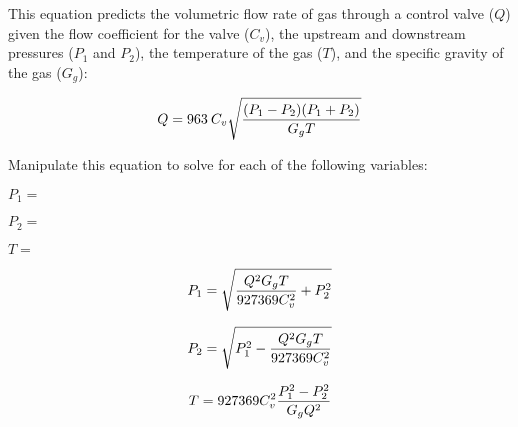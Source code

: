 

This equation predicts the volumetric flow rate of gas through a control valve ($Q$) given the flow coefficient for the valve ($C_v$), the upstream and downstream pressures ($P_1$ and $P_2$), the temperature of the gas ($T$), and the specific gravity of the gas ($G_g$):

$$Q = 963 \> C_v \sqrt{{(P_1 - P_2) (P_1 + P_2)} \over {G_g T}}$$

Manipulate this equation to solve for each of the following variables:

\vskip 10pt

$P_1 =$

\vskip 10pt

$P_2 =$

\vskip 10pt

$T =$

\vskip 10pt







$$P_1 = \sqrt{ {Q^2 G_g T \over 927369 C_v^2} + P_2^2}$$

\vskip 20pt

$$P_2 = \sqrt{P_1^2 - {Q^2 G_g T \over 927369 C_v^2}}$$

\vskip 20pt

$$T = 927369 C_v^2 {P_1^2 - P_2^2 \over G_g Q^2}$$











